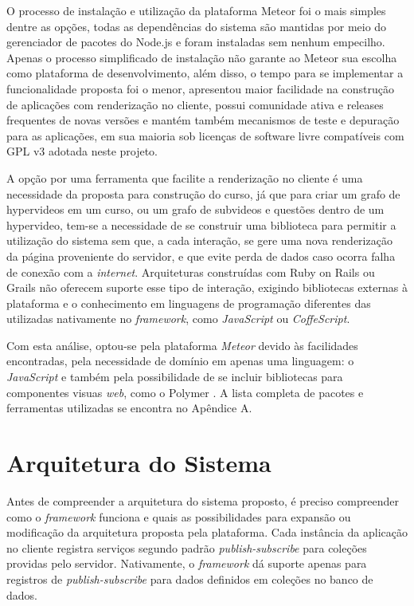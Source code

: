 O processo de instalação e utilização da plataforma Meteor foi o mais simples dentre as opções, todas as dependências do sistema são mantidas por meio do gerenciador de pacotes do Node.js \cite{nodejs2015} e foram instaladas sem nenhum empecilho. Apenas o processo simplificado de instalação não garante ao Meteor sua escolha como plataforma de desenvolvimento, além disso, o tempo para se implementar a funcionalidade proposta foi o menor, apresentou maior facilidade na construção de aplicações com renderização no cliente, possui comunidade ativa e releases frequentes de novas versões e mantém também mecanismos de teste e depuração para as aplicações, em sua maioria sob licenças de software livre compatíveis com GPL v3 adotada neste projeto.

A opção por uma ferramenta que facilite a renderização no cliente é uma necessidade da proposta para construção do curso, já que para criar um grafo de hypervideos em um curso, ou um grafo de subvideos e questões dentro de um hypervideo, tem-se a necessidade de se construir uma biblioteca para permitir a utilização do sistema sem que, a cada interação, se gere uma nova renderização da página proveniente do servidor, e que evite perda de dados caso ocorra falha de conexão com a \textit{internet}. Arquiteturas construídas com Ruby on Rails ou Grails não oferecem suporte esse tipo de interação, exigindo bibliotecas externas à plataforma e o conhecimento em linguagens de programação diferentes das utilizadas nativamente no \textit{framework}, como \textit{JavaScript} ou \textit{CoffeScript}.

Com esta análise, optou-se pela plataforma \textit{Meteor} devido às facilidades encontradas, pela necessidade de domínio em apenas uma linguagem: o \textit{JavaScript} e também pela possibilidade de se incluir bibliotecas para componentes visuas \textit{web}, como o Polymer \cite{polymer2015}. A lista completa de pacotes e ferramentas utilizadas se encontra no Apêndice A. 

\section{Arquitetura do Sistema}

Antes de compreender a arquitetura do sistema proposto, é preciso compreender como o \textit{framework} funciona e quais as possibilidades para expansão ou modificação da arquitetura proposta pela plataforma. Cada instância da aplicação no cliente registra serviços segundo padrão \textit{publish-subscribe} para coleções providas pelo servidor. Nativamente, o \textit{framework} dá suporte apenas para registros de \textit{publish-subscribe} para dados definidos em coleções no banco de dados.

